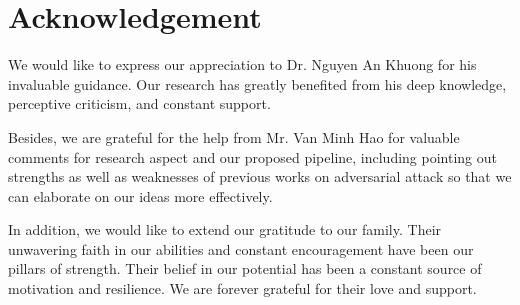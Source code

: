 \chapter*{Acknowledgement}

We would like to express our appreciation to Dr. Nguyen An Khuong for his invaluable guidance. Our research has greatly benefited from his deep knowledge, perceptive criticism, and constant support.

\noindent Besides, we are grateful for the help from Mr. Van Minh Hao for valuable comments for research aspect and our proposed pipeline, including pointing out strengths as well as weaknesses of previous works on adversarial attack so that we can elaborate on our ideas more effectively.

\noindent In addition, we would like to extend our gratitude to our family. Their unwavering faith in our abilities and constant encouragement have been our pillars of strength. Their belief in our potential has been a constant source of motivation and resilience. We are forever grateful for their love and support.
